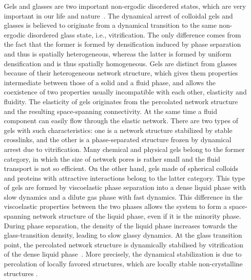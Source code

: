 \documentclass[12pt]{article}
\begin{document}
Gels and glasses are two important non-ergodic disordered states, which are very important 
in our life and nature~\cite{anderson2002insights,lekkerkerker2011colloids}.
The dynamical arrest of colloidal gels and glasses is believed to originate from a dynamical transition to the same non-ergodic disordered glass state, i.e., vitrification. The only difference comes from the fact that the former is formed by densification induced by phase separation and thus is spatially heterogeneous, whereas the latter is formed by uniform densification and is thus spatially homogeneous.
Gels are distinct from glasses because of their heterogeneous network structure, which gives them properties intermediate between
those of a solid and a fluid phase, and allows the coexistence of two properties usually incompatible with each other, 
elasticity and fluidity. 
The elasticity of gels originates from the percolated network structure and the resulting space-spanning connectivity. 
At the same time a fluid component can easily flow through the elastic network.
There are two types of gels with such characteristics: one is a network structure stabilized by stable crosslinks, and the other is a phase-separated structure frozen by dynamical arrest due to vitrification.
Many chemical and physical gels belong to the former category, in which the size of network pores is rather small and 
the fluid transport is not so efficient. On the other hand, gels made of spherical colloids and proteins 
with attractive interactions belong to the latter category. 
This type of gels are formed by viscoelastic phase separation \cite{tanaka1999colloid,tanaka2000viscoelastic} into a dense liquid phase with slow dynamics and a dilute gas phase 
with fast dynamics. This difference in the viscoelastic properties between the two phases allows the system to form a space-spanning 
network structure of the liquid phase, even if it is the minority phase. During phase separation, the density of the liquid phase 
increases towards the glass-transition density, leading to slow glassy dynamics.
At the glass transition point, the percolated network structure is dynamically stabilised by vitrification 
of the dense liquid phase~\cite{pusey1993dynamics,ilett1995phase,verhaegh1997transient,tanaka1999colloid,foffi2002,zaccarelli2007,lu2008gelation,zaccarelli2008gelation,testard2011}.  
More precisely, the dynamical stabilization is due to percolation of locally favored structures, which are locally stable non-crystalline structures \cite{royall2008g}.
\end{document}

